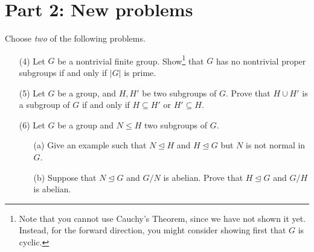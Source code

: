 \documentclass[11pt]{article}
\theoremstyle{definition}
\begin{document}
\section*{Part 2: New problems}

Choose \emph{two} of the following problems.

\begin{enumerate}
 
 \item[(4)] Let $G$ be a nontrivial finite group. Show\footnote{Note that you cannot use Cauchy's Theorem, since we have not shown it yet. Instead, for the forward direction, you might consider showing first that $G$ is cyclic.}  that $G$ has no nontrivial proper subgroups if and only if $|G|$ is prime. 



\item[(5)] Let $G$ be a group, and $H, H'$ be two subgroups of $G$. Prove that $H\cup H'$ is a subgroup of $G$ if and only if $H\subseteq H'$ or $H' \subseteq H$.


\item[(6)] Let $G$ be a group and $N\leq H$ two subgroups of $G$.
\begin{enumerate}
\item[(a)] Give an example such that $N\trianglelefteq H$ and $H\trianglelefteq G$ but $N$ is not normal in $G$.
\item[(b)] Suppose that $N\trianglelefteq G$ and $G/N$ is abelian. Prove that $H \trianglelefteq G$ and $G/H$ is abelian. 
\end{enumerate}

\end{enumerate}
\end{document}
